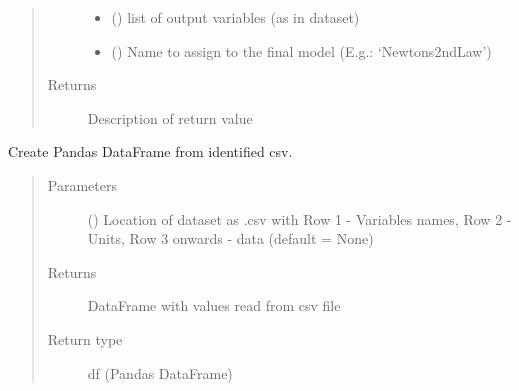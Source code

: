 \documentclass[letterpaper,10pt,english]{sphinxmanual}
\begin{document}
\begin{fulllineitems}
\begin{fulllineitems}
\begin{quote}
\begin{description}
\begin{itemize}
\item {} 
 () \textendash{} list of output variables (as in dataset)

\item {} 
 () \textendash{} Name to assign to the final model (E.g.: ‘Newtons2ndLaw’)

\end{itemize}

\item[{Returns}] \leavevmode
Description of return value

\end{description}\end{quote}

\end{fulllineitems}


\begin{fulllineitems}
\label{\detokenize{index:kChain.kChainModel.getDataset}}
Create Pandas DataFrame from identified csv.
\begin{quote}\begin{description}
\item[{Parameters}] \leavevmode
{} () \textendash{} Location of dataset as .csv with Row 1 - Variables names,
Row 2 - Units, Row 3 onwards - data (default = None)

\item[{Returns}] \leavevmode
DataFrame with values read from csv file

\item[{Return type}] \leavevmode
df (Pandas DataFrame)

\end{description}\end{quote}

\end{fulllineitems}


\end{fulllineitems}
\end{document}
